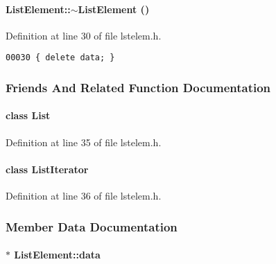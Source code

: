 \paragraph{\setlength{\rightskip}{0pt plus 5cm}List\-Element::$\sim$List\-Element ()\hspace{0.3cm}{\tt  [inline]}}\hfill



Definition at line 30 of file lstelem.h.\small\begin{verbatim}00030 { delete data; }
\end{verbatim}\normalsize 


\subsubsection{Friends And Related Function Documentation}
\label{ListElement_l0}
\paragraph{\setlength{\rightskip}{0pt plus 5cm}class List\hspace{0.3cm}{\tt  [friend]}}\hfill



Definition at line 35 of file lstelem.h.\label{ListElement_l1}
\paragraph{\setlength{\rightskip}{0pt plus 5cm}class List\-Iterator\hspace{0.3cm}{\tt  [friend]}}\hfill



Definition at line 36 of file lstelem.h.

\subsubsection{Member Data Documentation}
\label{ListElement_o1}
\paragraph{ $\ast$ List\-Element::data\hspace{0.3cm}{\tt  [private]}}\hfill



